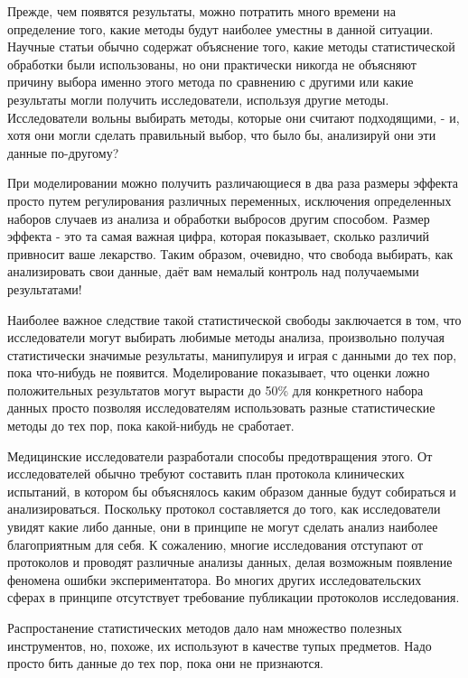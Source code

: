 Прежде, чем появятся результаты, можно потратить много времени на определение того, какие методы будут наиболее уместны в данной ситуации. Научные статьи обычно содержат объяснение того, какие методы статистической обработки были использованы, но они практически никогда не объясняют причину выбора именно этого метода по сравнению с другими или какие результаты могли получить исследователи, используя другие методы. Исследователи вольны выбирать методы, которые они считают подходящими, - и, хотя они могли сделать правильный выбор, что было бы, анализируй они эти данные по-другому?    

При моделировании можно получить различающиеся в два раза размеры эффекта просто путем регулирования различных переменных, исключения определенных наборов случаев из анализа и обработки выбросов другим способом. \cite{ioannidis_why_2008} Размер эффекта - это та самая важная цифра, которая показывает, сколько различий привносит ваше лекарство. Таким образом, очевидно, что свобода выбирать, как анализировать свои данные, даёт вам немалый контроль над получаемыми результатами!  

Наиболее важное следствие такой статистической свободы заключается в том, что исследователи могут выбирать любимые методы анализа, произвольно получая статистически значимые результаты, манипулируя и играя с данными до тех пор, пока что-нибудь не появится. Моделирование показывает, что оценки ложно положительных результатов могут вырасти до 50\% для конкретного набора данных просто позволяя исследователям использовать разные статистические методы до тех пор, пока какой-нибудь не сработает. \cite{simmons_false-positive_2011}

Медицинские исследователи разработали способы предотвращения этого. От исследователей обычно требуют составить план протокола клинических испытаний, в котором бы объяснялось каким образом данные будут собираться и анализироваться. Поскольку протокол составляется до того, как исследователи увидят какие либо данные, они в принципе не могут сделать анализ наиболее благоприятным для себя. К сожалению, многие исследования отступают от протоколов и проводят различные анализы данных, делая возможным появление феномена ошибки экспериментатора. \cite{chan_discrepancies_2008,chan_empirical_2004} Во многих других исследовательских сферах в принципе отсутствует требование публикации протоколов исследования.

Распростанение статистических методов дало нам множество полезных инструментов, но, похоже, их используют в качестве тупых предметов. Надо просто бить данные до тех пор, пока они не признаются.
